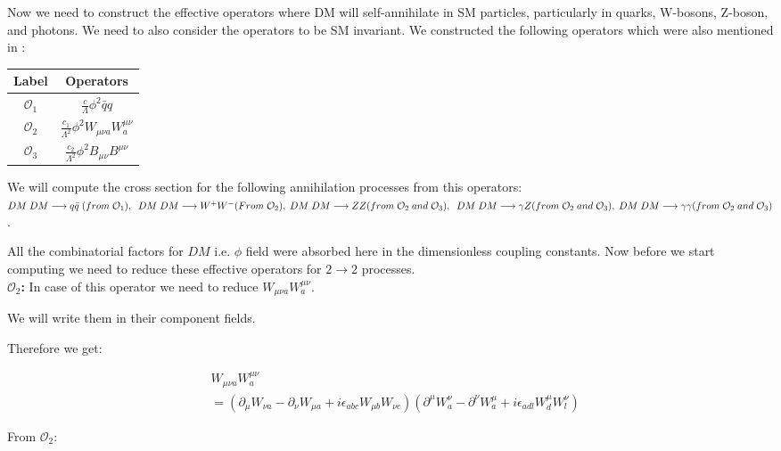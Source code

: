 \documentclass[12pt]{report}
\begin{document}
Now we need to construct the effective operators where DM will self-annihilate in SM particles, particularly in quarks, W-bosons, Z-boson, and photons. We need to also consider the operators to be SM invariant. We constructed the following operators which were also mentioned in  \cite{dmeft} :
\begin{center}
\begin{tabular}{|c|c|}
\hline
Label & Operators\\ \hline
$\mathcal{O}_1$ & $\frac{c}{\Lambda} \phi^2 \bar{q}q$\\ \hline
$\mathcal{O}_2$ & $\frac{c_1}{\Lambda^2} \phi^2 W_{\mu \nu a} W^{\mu \nu}_a$ \\ \hline

$\mathcal{O}_3$ & $\frac{c_2}{\Lambda^2} \phi^2 B_{\mu \nu} B^{\mu \nu}$\\ \hline
\end{tabular}
\end{center}
We will compute the cross section for the following annihilation processes from this operators: $ DM\; DM \longrightarrow q \bar{q}\; (from\; \mathcal{O}_1), \; \; DM\; DM \longrightarrow W^+W^-(From\; \mathcal{O}_2), \; \; \\
DM\; DM \longrightarrow ZZ (from\; \mathcal{O}_2 \; and\; \mathcal{O}_3 ), \; \; DM\; DM \longrightarrow \gamma Z (from\; \mathcal{O}_2 \; and\; \mathcal{O}_3 ) , \; \; \\ DM\; DM \longrightarrow \gamma  \gamma (from\; \mathcal{O}_2  \; and\; \mathcal{O}_3 )$.

All the combinatorial factors for $DM$ i.e. $\phi$ field were absorbed here in the dimensionless coupling constants.
Now before we start computing we need to reduce these effective operators for $2 \longrightarrow 2$ processes.\\

\textbf{$\mathcal{O}_2 $:} In case of this operator we need to reduce $W_{\mu \nu a} W^{\mu \nu}_a$.

We will write them in their component fields.

Therefore we get:

\begin{align*}
&W_{\mu \nu a} W^{\mu \nu}_a \\
& = (\partial_\mu W_{\nu a} - \partial_\nu W_{\mu a} + i \epsilon_{abc} W_{\mu b} W_{\nu c}) (\partial^\mu W^\nu_a- \partial^\nu W^\mu_a+ i \epsilon_{adl} W^\mu_d W^\nu_l)
\end{align*}

From $\mathcal{O}_2 $:
\end{document}

